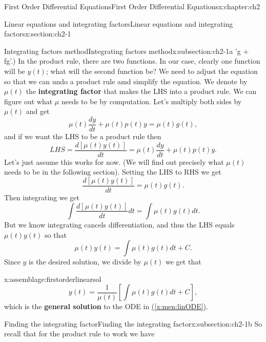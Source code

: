 \documentclass[oneside,10pt,]{book}
\newcommand{\xreffont}{\relax}
\newcommand{\terminology}[1]{\textbf{#1}}
\numberwithin{equation}{section}
\numberwithin{equation}{section}
\begin{document}
\begin{chapterptx}{First Order Differential Equations}{}{First Order Differential Equations}{}{}{x:chapter:ch2}
\begin{sectionptx}{Linear equations and integrating factors}{}{Linear equations and integrating factors}{}{}{x:section:ch2-1}
\begin{subsectionptx}{Integrating factors method}{}{Integrating factors method}{}{}{x:subsection:ch2-1a}
'g + fg'\).) In the product rule, there are two functions. In our case, clearly one function will be \(y(t)\); what will the second function be? We need to adjust the equation so that we can undo a product rule amd simplify the equation. We denote by \(\mu(t)\) the \terminology{integrating factor} that makes the LHS into a product rule. We can figure out what \(\mu\) needs to be by computation. Let's multiply both sides by \(\mu(t)\) and get%
\begin{equation*}
\mu(t)\frac{dy}{dt}+\mu(t)p(t)y=\mu(t)g(t),
\end{equation*}
and if we want the LHS to be a product rule then%
\begin{equation*}
LHS=\frac{d\left[\mu(t)y(t)\right]}{dt}=\mu(t)\frac{dy}{dt}+\mu(t)p(t)y.
\end{equation*}
Let's just assume this works for now. (We will find out precisely what \(\mu(t)\) needs to be in the following section). Setting the LHS to RHS we get%
\begin{equation*}
\frac{d\left[\mu(t)y(t)\right]}{dt}=\mu(t)g(t).
\end{equation*}
Then integrating we get%
\begin{equation*}
\int\frac{d\left[\mu(t)y(t)\right]}{dt}dt=\int\mu(t)g(t)dt.
\end{equation*}
But we know integrating cancels differentiation, and thus the LHS equals \(\mu(t)y(t)\) so that%
\begin{equation*}
\mu(t)y(t)=\int\mu(t)g(t)dt+C.
\end{equation*}
Since \(y\) is the desired solution, we divide by \(\mu(t)\) we get that \begin{assemblage}{}{x:assemblage:firstorderlinearsol}%
%
\begin{equation*}
y(t)=\frac{1}{\mu(t)}\left[\int\mu(t)g(t)dt+C\right],
\end{equation*}
which is the \terminology{general solution} to the ODE in \hyperref[x:men:linODE]{({\xreffont\ref{x:men:linODE}})}.%
\end{assemblage}
\end{subsectionptx}
%
%
\typeout{************************************************}
\typeout{************************************************}
%
\begin{subsectionptx}{Finding the integrating factor}{}{Finding the integrating factor}{}{}{x:subsection:ch2-1b}
So recall that for the product rule to work we have%
\begin{equation*}

\end{equation*}
\end{subsectionptx}
\end{sectionptx}
\end{chapterptx}
\end{document}
